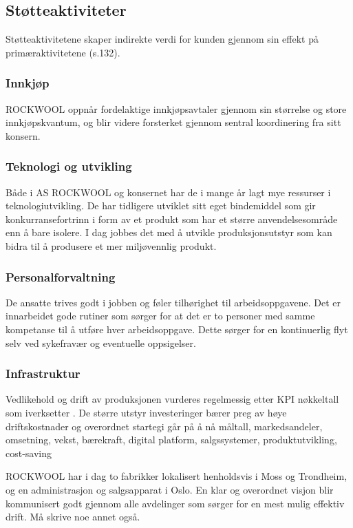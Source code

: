 \subsection{Støtteaktiviteter}
Støtteaktivitetene skaper indirekte verdi for kunden gjennom sin effekt på primæraktivitetene (s.132). 

\subsubsection*{Innkjøp}
ROCKWOOL oppnår fordelaktige innkjøpsavtaler gjennom sin størrelse og store innkjøpskvantum, og blir videre forsterket gjennom sentral koordinering fra sitt konsern.

\subsubsection*{Teknologi og utvikling}
Både i AS ROCKWOOL og konsernet har de i mange år lagt mye ressurser i teknologiutvikling. De har tidligere utviklet sitt eget bindemiddel som gir konkurransefortrinn i form av et produkt som har et større anvendelsesområde enn å bare isolere. I dag jobbes det med å utvikle produksjonsutstyr som kan bidra til å produsere et mer miljøvennlig produkt.

\subsubsection*{Personalforvaltning}
De ansatte trives godt i jobben og føler tilhørighet til arbeidsoppgavene. Det er innarbeidet gode rutiner som sørger for at det er to personer med samme kompetanse til å utføre hver arbeidsoppgave. Dette sørger for en kontinuerlig flyt selv ved sykefravær og eventuelle oppsigelser. 

\subsubsection*{Infrastruktur}
Vedlikehold og drift av produksjonen vurderes regelmessig etter KPI nøkkeltall som iverksetter . De større utstyr investeringer bærer preg av høye driftskostnader og overordnet startegi går på å nå måltall, markedsandeler, omsetning, vekst, bærekraft, digital platform, salgssystemer, produktutvikling, cost-saving

\indent \newline
ROCKWOOL har i dag to fabrikker lokalisert henholdsvis i Moss og Trondheim, og en administrasjon og salgsapparat i Oslo. En klar og overordnet visjon blir kommunisert godt gjennom alle avdelinger som sørger for en mest mulig effektiv drift. Må skrive noe annet også.
  
